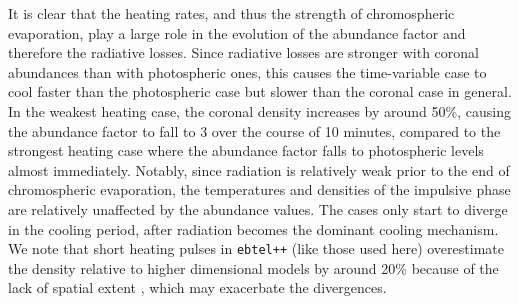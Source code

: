 \documentclass[twocolumn]{aastex631}
\begin{document}
It is clear that the heating rates, and thus the strength of chromospheric evaporation, play a large role in the evolution of the abundance factor and therefore the radiative losses.  Since radiative losses are stronger with coronal abundances than with photospheric ones, this causes the time-variable case to cool faster than the photospheric case but slower than the coronal case in general.  In the weakest heating case, the coronal density increases by around 50\%, causing the abundance factor to fall to 3 over the course of 10 minutes, compared to the strongest heating case where the abundance factor falls to photospheric levels almost immediately.  Notably, since radiation is relatively weak prior to the end of chromospheric evaporation, the temperatures and densities of the impulsive phase are relatively unaffected by the abundance values.  The cases only start to diverge in the cooling period, after radiation becomes the dominant cooling mechanism.  We note that short heating pulses in \texttt{ebtel++} (like those used here) overestimate the density relative to higher dimensional models by around 20\% because of the lack of spatial extent \citep{barnes2016}, which may exacerbate the divergences.
\end{document}
